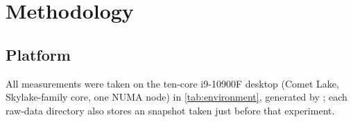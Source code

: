 \section{Methodology}\label{sec:method}

\subsection{Platform}
\newcommand{\acspinning}{single-thread runs and the loaded-latency probe pinned to CPU~2 (a physical
core, not CPU~0); multi-threaded runs place one thread per physical core}
All measurements were taken on the ten-core i9-10900F desktop (Comet Lake, Skylake-family core, one NUMA
node) in \cref{tab:environment}, generated by ; each raw-data directory also
stores an  snapshot taken just before that experiment.



